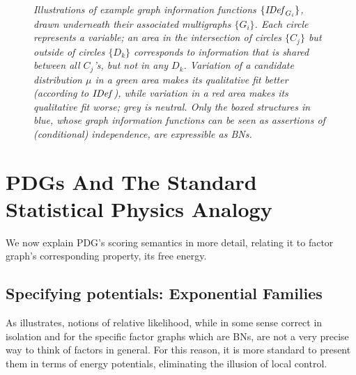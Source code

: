 \begin{figure}
{
}
\addtocounter{figure}{-1} %
\caption{\itshape Illustrations of example graph information
	  functions $\{ \mathit{IDef}_{G_i} \}$, drawn underneath their
	  associated multigraphs $\{ G_i\}$. Each circle represents a
	  variable; an area in the intersection of circles $\{C_j\}$
	  but outside of circles $\{D_k\}$ corresponds to information
	  that is shared between all $C_j$'s, but not in any
	  $D_k$. Variation of a candidate distribution $\mu$ in a
	  green area makes its qualitative fit better (according to
	  $\mathit{IDef}_{}$), while variation in a red area makes its
	  qualitative fit worse; grey is neutral. Only the boxed
	  structures in blue, whose graph information functions can be
	  seen as assertions of (conditional) independence, are
	  expressible as BNs.} 

\label{fig:info-diagram}
\end{figure}


\section{PDGs And The Standard Statistical Physics Analogy}
We now explain PDG's scoring semantics in more detail, relating it to factor graph's corresponding property, its free energy.

\subsection{Specifying potentials: Exponential
	  Families}\label{sec:fg-expfam}

As  illustrates, notions of relative likelihood, while in some sense correct in isolation and for the specific factor graphs which are BNs, are not a very precise way to think of factors in general. 
For this reason, it is more standard to present them in terms of energy potentials, eliminating the illusion of local control. 

